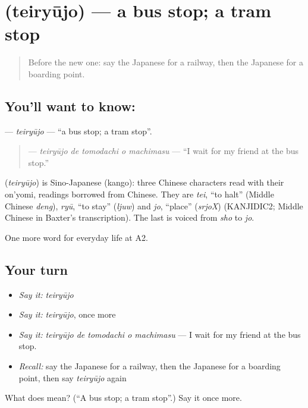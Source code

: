 \section[\texorpdfstring{\ja{ていりゅうじょ} (teiryūjo)}{ていりゅうじょ (teiryūjo)}]{ (teiryūjo) — a bus stop; a tram stop}

\label{lesson:JA-C200-teiryuujo}



\begin{quote}
Before the new one: say the Japanese for a railway, then the Japanese for a boarding point.
\end{quote}

\subsection*{You'll want to know: }
\textbf{} — \emph{teiryūjo} — \textquotedblleft{}a bus stop; a tram stop\textquotedblright{}.

\begin{quote}
\textbf{  } — \emph{teiryūjo de tomodachi o machimasu} — \textquotedblleft{}I wait for my friend at the bus stop.\textquotedblright{}
\end{quote}

\begin{cousinweb}
\textbf{} (\emph{teiryūjo}) is Sino-Japanese (kango): three Chinese characters read with their on'yomi, readings borrowed from Chinese. They are \emph{tei}, \textquotedblleft{}to halt\textquotedblright{} (Middle Chinese \emph{deng}), \emph{ryū}, \textquotedblleft{}to stay\textquotedblright{} (\emph{ljuw}) and \emph{jo}, \textquotedblleft{}place\textquotedblright{} (\emph{srjoX}) (KANJIDIC2; Middle Chinese in Baxter's transcription). The last is voiced from \emph{sho} to \emph{jo}.
\end{cousinweb}

\begin{grammarlens}[title={What you've built}]
One more word for everyday life at A2.
\end{grammarlens}

\subsection*{Your turn}
\begin{itemize}
\raggedright
  \item \emph{Say it:} \emph{teiryūjo}
  \item \emph{Say it:} \emph{teiryūjo}, once more
  \item \emph{Say it:} \emph{teiryūjo de tomodachi o machimasu} — I wait for my friend at the bus stop.
  \item \emph{Recall:} say the Japanese for a railway, then the Japanese for a boarding point, then say \emph{teiryūjo} again
\end{itemize}

\begin{tcolorbox}[breakable,colback=teal!4,colframe=teal!35!black,title={Before you move on}]
What does  mean? (\textquotedblleft{}A bus stop; a tram stop\textquotedblright{}.) Say it once more.
\end{tcolorbox}
